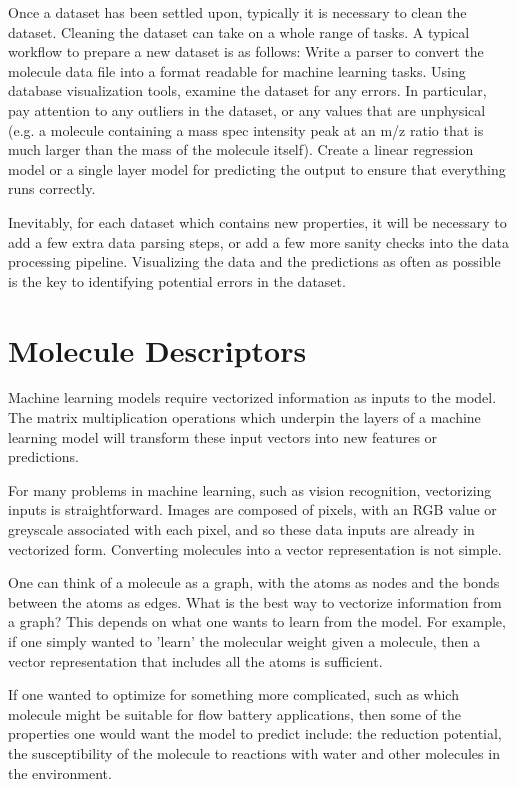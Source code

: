 Once a dataset has been settled upon, typically it is necessary to clean the dataset. Cleaning the dataset can take on a whole range of tasks. A typical workflow to prepare a new dataset is as follows:
Write a parser to convert the molecule data file into a format readable for machine learning tasks.
Using database visualization tools, examine the dataset for any errors. In particular, pay attention to any outliers in the dataset, or any values that are unphysical (e.g. a molecule containing a mass spec intensity peak at an m/z ratio that is much larger than the mass of the molecule itself).
Create a linear regression model or a single layer model for predicting the output to ensure that everything runs correctly.

Inevitably, for each dataset which contains new properties, it will be necessary to add a few extra data parsing steps, or add a few more sanity checks into the data processing pipeline. Visualizing the data and the predictions as often as possible is the key to identifying potential errors in the dataset.

\section{Molecule Descriptors}

Machine learning models require vectorized information as inputs to the model. The matrix multiplication operations which underpin the layers of a machine learning model will transform these input vectors into new features or predictions.

For many problems in machine learning, such as vision recognition, vectorizing inputs is straightforward. Images are composed of pixels, with an RGB value or greyscale associated with each pixel, and so these data inputs are already in vectorized form. Converting molecules into a vector representation is not simple. 

One can think of a molecule as a graph, with the atoms as nodes and the bonds between the atoms as edges. What is the best way to vectorize information from a graph? This depends on what one wants to learn from the model. For example, if one simply wanted to 'learn' the molecular weight given a molecule, then a vector representation that includes all the atoms is sufficient.

If one wanted to optimize for something more complicated, such as which molecule might be suitable for  flow battery applications, then some of the properties one would want the model to predict include: the reduction potential, the susceptibility of the molecule to reactions with water and other molecules in the environment\cite{tabor_2018}.

